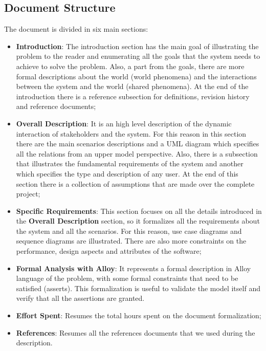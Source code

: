 \subsection{Document Structure}
The document is divided in six main sections:
\begin{itemize}
    \item \textbf{Introduction}: The introduction section has the main goal of illustrating the problem to the reader and enumerating all the goals that
          the system needs to achieve to solve the problem. Also, a part from the goals, there are more formal descriptions about the world (world phenomena) and the
          interactions between the system and the world (shared phenomena). At the end of the introduction there is a reference subsection for definitions, revision history and reference documents;
    \item \textbf{Overall Description}: It is an high level description of the dynamic interaction of stakeholders and the system. For this reason in this section there are
          the main scenarios descriptions and a UML diagram which specifies all the relations from an upper model perspective. Also, there is a subsection that illustrates
          the fundamental requirements of the system and another which specifies the type and description of any user. At the end of this section there is a collection of assumptions that are made over the complete project;
    \item \textbf{Specific Requirements}: This section focuses on all the details introduced in the \textbf{Overall Description} section, so it formalizes all the requirements
          about the system and all the scenarios. For this reason, use case diagrams and sequence diagrams are illustrated. There are also more constraints on the performance, design aspects and attributes of the software;
    \item \textbf{Formal Analysis with Alloy}: It represents a formal description in Alloy language of the problem, with some formal constraints that need to be satisfied (asserts).
          This formalization is useful to validate the model itself and verify that all the assertions are granted.
    \item \textbf{Effort Spent}: Resumes the total hours spent on the document formalization;
    \item \textbf{References}: Resumes all the references documents that we used during the description.
\end{itemize}



\clearpage